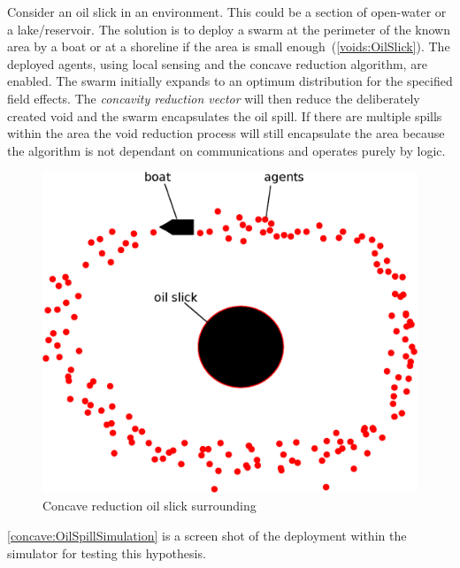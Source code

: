 Consider an oil slick in an environment. This could be a section of open-water or a lake/reservoir. The solution is to deploy a swarm at the perimeter of the known area by a boat or at a shoreline if the area is small enough~(\autoref{voids:OilSlick}). The deployed agents, using local sensing and the concave reduction algorithm, are enabled. The swarm initially expands to an optimum distribution for the specified field effects. The \textit{concavity reduction vector} will then reduce the deliberately created void and the swarm encapsulates the oil spill. If there are multiple spills within the area the void reduction process will still encapsulate the area because the algorithm is not dependant on communications and operates purely by logic.  

\begin{figure}[H]
\begin{center}
\includegraphics[width=12cm]{CHAPTER-7/figures/OilSlick}
\end{center}
\caption{Concave reduction oil slick surrounding\label{voids:OilSlick}}
\end{figure}

\autoref{concave:OilSpillSimulation} is a screen shot of the deployment within the simulator for testing this hypothesis. 

